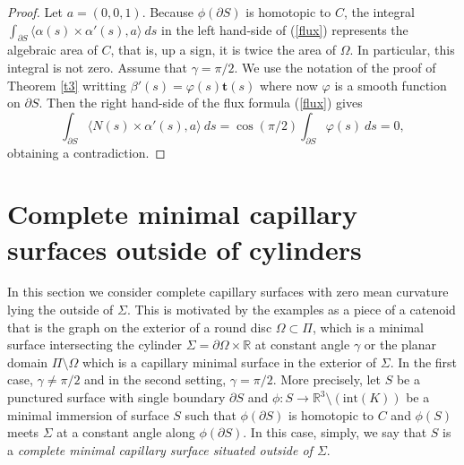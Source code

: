 \documentclass[12pt,a4paper]{amsart}
\begin{document}
\begin{proof} Let $a=(0,0,1)$. Because $\phi(\partial S)$ is homotopic to $C$, the integral $\int_{\partial S}\langle
\alpha(s)\times\alpha'(s),a\rangle\ ds$ in the left hand-side of (\ref{flux}) represents the algebraic area of $C$, that is, up a sign, it is twice the area of $\Omega$. In particular, this integral is not zero. Assume that $\gamma=\pi/2$. We use the notation of the proof of Theorem \ref{t3} writting $\beta'(s)=\varphi(s) \textbf{t}(s)$ where now $\varphi$ is a smooth function on $\partial S$. Then the right hand-side of the flux formula (\ref{flux}) gives
$$\int_{\partial S}\langle N(s)\times\alpha'(s),a\rangle\ ds= \cos(\pi/2)\int_{\partial S}\varphi(s)\ ds=0,$$ obtaining a contradiction.
\end{proof}
\section{ Complete minimal capillary surfaces outside of cylinders}\label{sec5}
In this section we consider complete capillary surfaces with zero mean curvature lying the outside of $\Sigma$. This is motivated by the examples as a piece of a catenoid that is the graph on the exterior of a round disc $\Omega\subset\Pi$, which is a minimal surface intersecting the cylinder $\Sigma=\partial\Omega\times{\mathbb R}$ at constant angle $\gamma$ or the planar domain $\Pi\setminus\Omega$ which is a capillary minimal surface in the exterior of $\Sigma$. In the first case, $\gamma\not=\pi/2$ and in the second setting, $\gamma=\pi/2$. More precisely, let $S$ be a punctured surface with single boundary $\partial S$ and $\phi:S\rightarrow {\mathbb R}^3\setminus(\mbox{int}(K))$ be a minimal immersion of surface $S$ such that $\phi(\partial S)$ is homotopic to $C$ and $\phi(S)$ meets $\Sigma$ at a constant angle along $\phi(\partial S)$.
In this case, simply, we say that $S$ is a {\it complete minimal capillary surface situated outside of $\Sigma$}.
\end{document}
